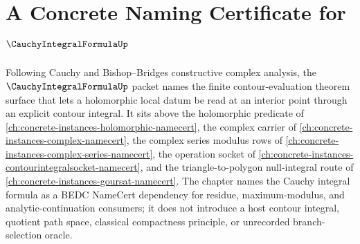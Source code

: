 \chapter{A Concrete Naming Certificate for $\CauchyIntegralFormulaUp$}
\label{ch:concrete-instances-cauchy-integral-formula-namecert}

Following Cauchy and Bishop--Bridges constructive complex analysis, the $\CauchyIntegralFormulaUp$ packet names the finite contour-evaluation theorem surface that lets a holomorphic local datum be read at an interior point through an explicit contour integral. It sits above the holomorphic predicate of \autoref{ch:concrete-instances-holomorphic-namecert}, the complex carrier of \autoref{ch:concrete-instances-complex-namecert}, the complex series modulus rows of \autoref{ch:concrete-instances-complex-series-namecert}, the operation socket of \autoref{ch:concrete-instances-contourintegralsocket-namecert}, and the triangle-to-polygon null-integral route of \autoref{ch:concrete-instances-goursat-namecert}. The chapter names the Cauchy integral formula as a BEDC NameCert dependency for residue, maximum-modulus, and analytic-continuation consumers; it does not introduce a host contour integral, quotient path space, classical compactness principle, or unrecorded branch-selection oracle.

